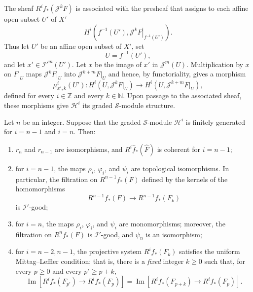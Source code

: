 The sheaf $R^i f_*(\mathcal J^kF)$ is associated with the presheaf that
assigns to each affine open subset $U'$ of $X'$
\begin{equation}
\tag{1.10}\label{eq:IX.1.10}
H^i\!\left(f^{-1}(U'),
  \left.\mathcal J^kF\right|_{f^{-1}(U')}\right).
\end{equation}
Thus let $U'$ be an affine open subset of $X'$, set
\[
U=f^{-1}(U'),
\]
and let $x'\in{\mathcal I'}^m(U')$. Let $x$ be the image of $x'$ in
$\mathcal J^m(U)$. Multiplication by $x$ on $F|_U$ maps
$\mathcal J^kF|_U$ into $\mathcal J^{k+m}F|_U$ and hence, by
functoriality, gives a morphism
\begin{equation}
\tag{1.11}\label{eq:IX.1.11}
\mu^i_{x',k}(U'):
H^i(U,\mathcal J^kF|_U)
\longrightarrow
H^i(U,\mathcal J^{k+m}F|_U),
\end{equation}
defined for every $i\in\mathbb Z$ and every $k\in\mathbb N$. Upon passage
to the associated sheaf, these morphisms give $\mathcal H^i$ its graded
$\mathcal S$-module structure.

\begin{theoremIXoneone}
Let $n$ be an integer. Suppose that the graded $\mathcal S$-module
$\mathcal H^i$ is finitely generated for $i=n-1$ and $i=n$. Then:
\begin{enumerate}
\renewcommand{\labelenumi}{(\arabic{enumi})}
\setcounter{enumi}{-1}
\item
$r_n$ and $r_{n-1}$ are isomorphisms, and
$R^i\widehat f_*(\widehat F)$ is coherent for $i=n-1$;

\item
for $i=n-1$, the maps $\rho_i$, $\varphi_i$, and $\psi_i$ are topological
isomorphisms. In particular, the filtration on $R^{n-1}f_*(F)$ defined by
the kernels of the homomorphisms
\begin{equation}
\tag{1.12}\label{eq:IX.1.12}
R^{n-1}f_*(F)\longrightarrow R^{n-1}f_*(F_k)
\end{equation}
is $\mathcal I'$-good;

\item
for $i=n$, the maps $\rho_i$, $\varphi_i$, and $\psi_i$ are monomorphisms;
moreover, the filtration on $R^n f_*(F)$ is $\mathcal I'$-good, and $\psi_n$
is an isomorphism;

\item
for $i=n-2,n-1$, the projective system $R^i f_*(F_k)$ satisfies the uniform
Mittag--Leffler condition; that is, there is a \emph{fixed} integer $k\geq0$
such that, for every $p\geq0$ and every $p'\geq p+k$,
\[
\operatorname{Im}\!\left[R^i f_*(F_{p'})\longrightarrow R^i f_*(F_p)\right]
=
\operatorname{Im}\!\left[R^i f_*(F_{p+k})\longrightarrow R^i f_*(F_p)\right].
\]
\end{enumerate}
\end{theoremIXoneone}

